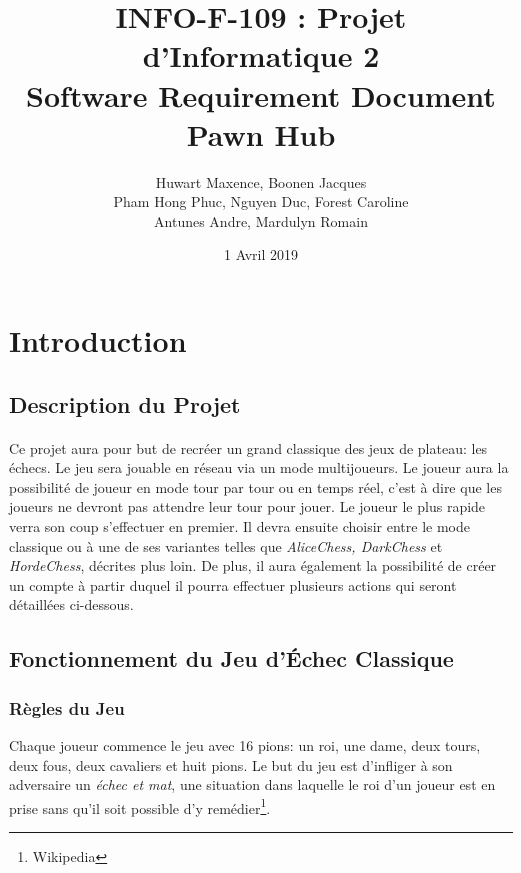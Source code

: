 \documentclass[10pt, a4paper]{article}
\title{\LARGE{INFO-F-109 : Projet d'Informatique 2 }\\
       \textbf{Software Requirement Document\\
	   Pawn Hub}}
\author{Huwart Maxence, Boonen Jacques\\
		Pham Hong Phuc, Nguyen Duc, Forest Caroline\\
		Antunes Andre, Mardulyn Romain}
\date{1 Avril 2019}
\begin{document}
	\maketitle
	\newpage
	\renewcommand{\contentsname}{Table des Matières}
	\tableofcontents %
	\newpage
	\section{Introduction}
		\subsection{Description du Projet}
			\paragraph{}Ce projet aura pour but de recréer un grand classique des jeux de plateau: les échecs. Le jeu sera jouable en réseau via un mode multijoueurs. Le joueur aura la possibilité de joueur en mode tour par tour ou en temps réel, c'est à dire que les joueurs ne devront pas attendre leur tour pour jouer. Le joueur le plus rapide verra son coup s'effectuer en premier. Il devra ensuite choisir entre le mode classique ou à une de ses variantes telles que  {\itshape AliceChess, DarkChess} et {\itshape HordeChess}, décrites plus loin. De plus, il aura également la possibilité de créer un compte à partir duquel il pourra effectuer plusieurs actions qui seront détaillées ci-dessous. 
			
			\subsection{Fonctionnement du Jeu d'Échec Classique}
			\subsubsection{Règles du Jeu}
			Chaque joueur commence le jeu avec 16 pions: un roi, une dame, deux tours, deux fous, deux cavaliers et huit pions. Le but du jeu est d'infliger à son adversaire un \textit{échec et mat}, une situation dans laquelle le roi d'un joueur est en prise sans qu'il soit possible d'y remédier\footnote{Wikipedia}.
\end{document}
